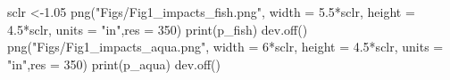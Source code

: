 \documentclass[
]{article}
\newenvironment{Shaded}{\begin{snugshade}}{\end{snugshade}}
\newcommand{\AttributeTok}[1]{\textcolor[rgb]{0.77,0.63,0.00}{#1}}
\newcommand{\DecValTok}[1]{\textcolor[rgb]{0.00,0.00,0.81}{#1}}
\newcommand{\FloatTok}[1]{\textcolor[rgb]{0.00,0.00,0.81}{#1}}
\newcommand{\FunctionTok}[1]{\textcolor[rgb]{0.00,0.00,0.00}{#1}}
\newcommand{\NormalTok}[1]{#1}
\newcommand{\OtherTok}[1]{\textcolor[rgb]{0.56,0.35,0.01}{#1}}
\newcommand{\SpecialCharTok}[1]{\textcolor[rgb]{0.00,0.00,0.00}{#1}}
\newcommand{\StringTok}[1]{\textcolor[rgb]{0.31,0.60,0.02}{#1}}
\begin{document}
\begin{Shaded}
\begin{Highlighting}[]
     
\NormalTok{    sclr }\OtherTok{\textless{}{-}}\FloatTok{1.05}
    \FunctionTok{png}\NormalTok{(}\StringTok{"Figs/Fig1\_impacts\_fish.png"}\NormalTok{, }
        \AttributeTok{width =} \FloatTok{5.5}\SpecialCharTok{*}\NormalTok{sclr, }\AttributeTok{height =} \FloatTok{4.5}\SpecialCharTok{*}\NormalTok{sclr, }\AttributeTok{units =} \StringTok{"in"}\NormalTok{,}\AttributeTok{res =} \DecValTok{350}\NormalTok{)}
    \FunctionTok{print}\NormalTok{(p\_fish)}
    \FunctionTok{dev.off}\NormalTok{()}
     \FunctionTok{png}\NormalTok{(}\StringTok{"Figs/Fig1\_impacts\_aqua.png"}\NormalTok{, }
        \AttributeTok{width =} \DecValTok{6}\SpecialCharTok{*}\NormalTok{sclr, }\AttributeTok{height =} \FloatTok{4.5}\SpecialCharTok{*}\NormalTok{sclr, }\AttributeTok{units =} \StringTok{"in"}\NormalTok{,}\AttributeTok{res =} \DecValTok{350}\NormalTok{)}
    \FunctionTok{print}\NormalTok{(p\_aqua)}
    \FunctionTok{dev.off}\NormalTok{()}
  

\end{Highlighting}
\end{Shaded}
\end{document}
